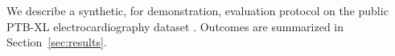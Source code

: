 We describe a synthetic, for demonstration, evaluation protocol on the public PTB-XL
electrocardiography dataset \citep{wagner2020ptbxl}. Outcomes are summarized in
Section~\ref{sec:results}.
